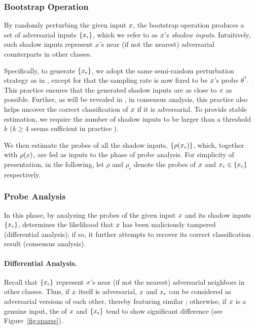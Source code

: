 \subsubsection{Bootstrap Operation}
\label{sec:boostrap}

By randomly perturbing the given input $x$, the bootstrap operation produces a set of adversarial inputs $\{x_{\epsilon}\}$, which we refer to as $x$'s {\em shadow inputs}. Intuitively, such shadow inputs represent $x$'s near (if not the nearest) adversarial counterparts in other classes.



Specifically, to generate $\{x_{\epsilon}\}$, we adopt the same semi-random perturbation strategy as in , except for that the sampling rate is now fixed to be $x$'s probe $\theta^*$. This practice ensures that the generated shadow inputs are as close to $x$ as possible. Further, as will be revealed in , in consensus analysis, this practice also helps uncover the correct classification of $x$ if it is adversarial. To provide stable estimation, we require the number of shadow inputs to be larger than a threshold $k$ ($k \geq 4$ seems sufficient in practice ).

We then estimate the probes of all the shadow inputs, $\{\rho(x_{\epsilon})\}$, which, together with $\rho(x)$, are fed as inputs to the phase of probe analysis. For simplicity of presentation, in the following, let $\rho$ and $\rho_\epsilon$ denote the probes of $x$ and $x_{\epsilon} \in \{x_{\epsilon}\}$ respectively.



\subsubsection{Probe Analysis}
\label{sec:arpa}

In this phase, by analyzing the probes of the given input $x$ and its shadow inputs $\{x_{\epsilon}\}$, \system determines the likelihood that $x$ has been maliciously tampered (differential analysis); if so, it further attempts to recover its correct classification result (consensus analysis).


\paragraph*{Differential Analysis.\;} Recall that $\{x_{\epsilon}\}$ represent $x$'s near (if not the nearest) adversarial neighbors in other classes. Thus, if $x$ itself is adversarial, $x$ and $x_{\epsilon}$ can be considered as adversarial versions of each other, thereby featuring similar \ars; otherwise, if $x$ is a genuine input, the \ars of $x$ and $\{x_{\epsilon}\}$ tend to show significant difference (see Figure~\ref{fig:sparse}).

